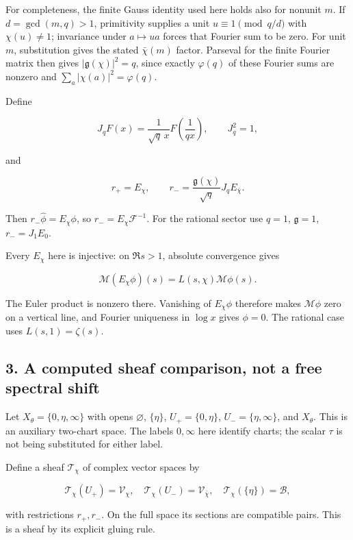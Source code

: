 \documentclass[
]{article}
\begin{document}
For completeness, the finite Gauss identity used here holds also for
nonunit \(m\). If \(d=\gcd(m,q)>1\), primitivity supplies a unit
\(u\equiv1\pmod{q/d}\) with \(\chi(u)\ne1\); invariance under
\(a\mapsto ua\) forces that Fourier sum to be zero. For unit \(m\),
substitution gives the stated \(\bar\chi(m)\) factor. Parseval for the
finite Fourier matrix then gives \(|\mathfrak g(\chi)|^2=q\), since
exactly \(\varphi(q)\) of these Fourier sums are nonzero and
\(\sum_a|\chi(a)|^2=\varphi(q)\).

Define

\[
J_qF(x)=\frac1{\sqrt q\,x}F\!\left(\frac1{qx}\right),\qquad J_q^2=1,
\]

and

\[
r_+=E_\chi,\qquad r_- =\frac{\mathfrak g(\chi)}{\sqrt q}J_qE_{\bar\chi}.
\]

Then \(r_-\widehat\phi=E_\chi\phi\), so \(r_-=E_\chi\mathcal F^{-1}\).
For the rational sector use \(q=1\), \(\mathfrak g=1\), \(r_-=J_1E_0\).

Every \(E_\chi\) here is injective: on \(\Re s>1\), absolute convergence
gives

\[
\mathcal M(E_\chi\phi)(s)=L(s,\chi)\mathcal M\phi(s). \tag{2.6}
\]

The Euler product is nonzero there. Vanishing of \(E_\chi\phi\)
therefore makes \(\mathcal M\phi\) zero on a vertical line, and Fourier
uniqueness in \(\log x\) gives \(\phi=0\). The rational case uses
\(L(s,1)=\zeta(s)\).

\subsection{3. A computed sheaf comparison, not a free spectral
shift}\label{a-computed-sheaf-comparison-not-a-free-spectral-shift}

Let \(X_\theta=\{0,\eta,\infty\}\) with opens \(\varnothing\),
\(\{\eta\}\), \(U_+=\{0,\eta\}\), \(U_-=\{\eta,\infty\}\), and
\(X_\theta\). This is an auxiliary two-chart space. The labels
\(0,\infty\) here identify charts; the scalar \(\tau\) is not being
substituted for either label.

Define a sheaf \(\mathcal T_\chi\) of complex vector spaces by

\[
\mathcal T_\chi(U_+)=\mathscr V_\chi,
\quad\mathcal T_\chi(U_-)=\mathscr V_{\bar\chi},
\quad\mathcal T_\chi(\{\eta\})=\mathscr B,
\]

with restrictions \(r_+,r_-\). On the full space its sections are
compatible pairs. This is a sheaf by its explicit gluing rule.
\end{document}
